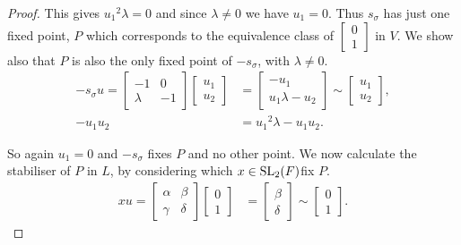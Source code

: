 \begin{proof}
This gives ${u_1}^2 \lambda = 0$ and since $\lambda \neq 0$ we have $u_1 = 0$. Thus $s_\sigma$ has just one fixed point, $P$ which corresponds to the equivalence class of $\begin{bmatrix} 0 \\ 1 \end{bmatrix}$ in $V$. We show also that $P$ is also the only fixed point of $-s_\sigma$, with $\lambda \neq 0$.
\begin{align*} -s_\sigma u = \begin{bmatrix} -1 & 0 \\ \lambda & -1 \end{bmatrix} \begin{bmatrix} u_1 \\ u_2 \end{bmatrix} &= \begin{bmatrix} -u_1 \\ u_1 \lambda - u_2 \end{bmatrix} \sim \begin{bmatrix} u_1 \\ u_2 \end{bmatrix}, 
\\[1.5ex] -u_1 u_2 &= {u_1}^2 \lambda - u_1 u_2.
\end{align*}

So again $u_1 =0$ and $-s_\sigma$ fixes $P$ and no other point. We now calculate the stabiliser of $P$ in $L$, by considering which $x \in \operatorname{SL}_2(F)$fix $P$. \\
\begin{align*} x u = \begin{bmatrix} \alpha & \beta \\ \gamma & \delta \end{bmatrix} \begin{bmatrix} 0 \\ 1 \end{bmatrix} &= \begin{bmatrix} \beta \\ \delta \end{bmatrix} \sim \begin{bmatrix} 0 \\ 1 \end{bmatrix}.
\end{align*}


\end{proof}
